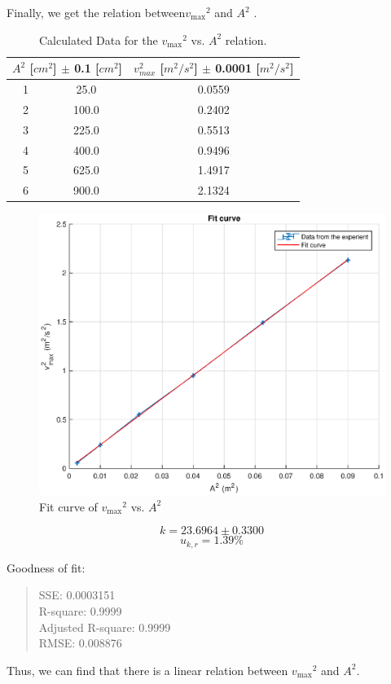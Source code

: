 Finally, we get the relation between$ {v_{\max}}^2$ and $A^2$ .

\begin{table}[H]
	\centering
	\begin{tabular}{|c|c|c|}
	\hline
	\multicolumn{2}{|c|}{$A^2$ [$cm^2$] $\pm$ 0.1 [$cm^2$]} 
	&  $v_{max}^2$ [$m^2/s^2$] $\pm$ 0.0001 [$m^2/s^2$] \\ \hline
	1  &  25.0 & 0.0559 \\ \hline
	2  & 100.0 & 0.2402 \\ \hline
	3  & 225.0 & 0.5513 \\ \hline
	4  & 400.0 & 0.9496 \\ \hline
	5  & 625.0 & 1.4917 \\ \hline
	6  & 900.0 & 2.1324 \\ \hline
	\end{tabular}
	\caption{Calculated Data for the $ {v_{\max}}^2$ vs. $A^2$ relation.}
\label{A2_v2}
\end{table}

\begin{figure}[H]
	\centering
	\includegraphics[width=13cm]{matlab/fitfig/av1}
	\caption{Fit curve of $ {v_{\max}}^2$ vs. $A^2$}
\end{figure}

$$ k =   23.6964 \pm 0.3300  $$
$$ u_{k,r} = 1.39 \% $$

Goodness of fit: 
\begin{quote}
	\centering
  SSE: 0.0003151 				\\
  R-square: 0.9999          	\\
  Adjusted R-square: 0.9999 	\\
  RMSE: 0.008876    			\\
\end{quote}

Thus, we can find that there is a linear relation between $ {v_{\max}}^2$ and $A^2$.
